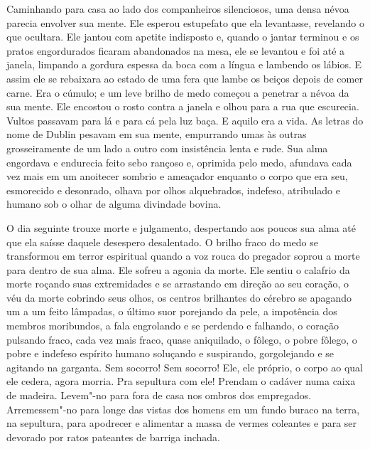 Caminhando para casa ao lado dos companheiros silenciosos, uma densa
névoa parecia envolver sua mente. Ele esperou estupefato que ela
levantasse, revelando o que ocultara. Ele jantou com apetite indisposto
e, quando o jantar terminou e os pratos engordurados ficaram
abandonados na mesa, ele se levantou e foi até a janela, limpando a
gordura espessa da boca com a língua e lambendo os lábios. E assim ele
se rebaixara ao estado de uma fera que lambe os beiços depois de comer
carne. Era o cúmulo; e um leve brilho de medo começou a penetrar a
névoa da sua mente. Ele encostou o rosto contra a janela e olhou para a
rua que escurecia. Vultos passavam para lá e para cá pela luz baça. E
aquilo era a vida. As letras do nome de Dublin pesavam em sua mente,
empurrando umas às outras grosseiramente de um lado a outro com
insistência lenta e rude. Sua alma engordava e endurecia feito sebo
rançoso e, oprimida pelo medo, afundava cada vez mais em um anoitecer
sombrio e ameaçador enquanto o corpo que era seu, esmorecido e
desonrado, olhava por olhos alquebrados, indefeso, atribulado e humano
sob o olhar de alguma divindade bovina.

O dia seguinte trouxe morte e julgamento, despertando aos poucos sua
alma até que ela saísse daquele desespero desalentado. O brilho fraco
do medo se transformou em terror espiritual quando a voz rouca do
pregador soprou a morte para dentro de sua alma. Ele sofreu a agonia da
morte. Ele sentiu o calafrio da morte roçando suas extremidades e se
arrastando em direção ao seu coração, o véu da morte cobrindo seus
olhos, os centros brilhantes do cérebro se apagando um a um feito
lâmpadas, o último suor porejando da pele, a impotência dos membros
moribundos, a fala engrolando e se perdendo e falhando, o coração
pulsando fraco, cada vez mais fraco, quase aniquilado, o fôlego, o
pobre fôlego, o pobre e indefeso espírito humano soluçando e
suspirando, gorgolejando e se agitando na garganta. Sem socorro! Sem
socorro! Ele, ele próprio, o corpo ao qual ele cedera, agora morria.
Pra sepultura com ele! Prendam o cadáver numa caixa de madeira.
Levem"-no para fora de casa nos ombros dos empregados. Arremessem"-no
para longe das vistas dos homens em um fundo buraco na terra, na
sepultura, para apodrecer e alimentar a massa de vermes coleantes e
para ser devorado por ratos pateantes de barriga inchada.


